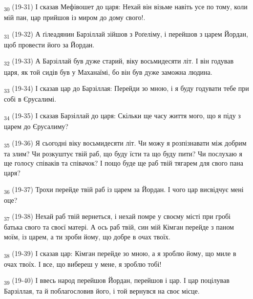 \begin{tcolorbox}
\textsubscript{30} (19-31) І сказав Мефівошет до царя: Нехай він візьме навіть усе по тому, коли мій пан, цар прийшов із миром до дому свого!.
\end{tcolorbox}
\begin{tcolorbox}
\textsubscript{31} (19-32) А ґілеадянин Барзіллай зійшов з Роґеліму, і перейшов з царем Йордан, щоб провести його за Йордан.
\end{tcolorbox}
\begin{tcolorbox}
\textsubscript{32} (19-33) А Барзіллай був дуже старий, віку восьмидесяти літ. І він годував царя, як той сидів був у Маханаїмі, бо він був дуже заможна людина.
\end{tcolorbox}
\begin{tcolorbox}
\textsubscript{33} (19-34) І сказав цар до Барзіллая: Перейди зо мною, і я буду годувати тебе при собі в Єрусалимі.
\end{tcolorbox}
\begin{tcolorbox}
\textsubscript{34} (19-35) І сказав Барзіллай до царя: Скільки ще часу життя мого, що я піду з царем до Єрусалиму?
\end{tcolorbox}
\begin{tcolorbox}
\textsubscript{35} (19-36) Я сьогодні віку восьмидесяти літ. Чи можу я розпізнавати між добрим та злим? Чи розкуштує твій раб, що буду їсти та що буду пити? Чи послухаю я ще голосу співаків та співачок? І пощо буде ще раб твій тягарем для свого пана царя?
\end{tcolorbox}
\begin{tcolorbox}
\textsubscript{36} (19-37) Трохи перейде твій раб із царем за Йордан. І чого цар висвідчує мені оце?
\end{tcolorbox}
\begin{tcolorbox}
\textsubscript{37} (19-38) Нехай раб твій вернеться, і нехай помре у своєму місті при гробі батька свого та своєї матері. А ось раб твій, син мій Кімган перейде з паном моїм, із царем, а ти зроби йому, що добре в очах твоїх.
\end{tcolorbox}
\begin{tcolorbox}
\textsubscript{38} (19-39) І сказав цар: Кімган перейде зо мною, а я зроблю йому, що миле в очах твоїх. І все, що вибереш у мене, я зроблю тобі!
\end{tcolorbox}
\begin{tcolorbox}
\textsubscript{39} (19-40) І ввесь народ перейшов Йордан, перейшов і цар. І цар поцілував Барзіллая, та й поблагословив його, і той вернувся на своє місце.
\end{tcolorbox}
